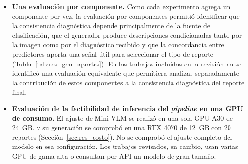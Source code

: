 \begin{itemize}
    el 80\,\% de las imágenes con un riesgo de 0.085, sin umbrales ajustados sobre el conjunto de prueba
    (Sección~\ref{sec:disc_concordancia}).
    \item \textbf{Una evaluación por componente.} Como cada experimento agrega un componente por vez, la evaluación por componentes permitió identificar que la consistencia diagnóstica depende principalmente de la fuente de clasificación, que el generador produce descripciones condicionadas tanto por la imagen como por el diagnóstico recibido y que la concordancia entre predictores aporta una señal útil para seleccionar el tipo de reporte (Tabla~\ref{tab:res_gen_aportes}). En los trabajos incluidos en la revisión no se identificó una evaluación equivalente que permitiera analizar separadamente la contribución de estos componentes a la consistencia diagnóstica del reporte final.
    \item \textbf{Evaluación de la factibilidad de inferencia del \emph{pipeline} en una GPU de consumo.} El ajuste de Mini-VLM se realizó en una sola GPU A30 de 24~GB, y su generación se comprobó en una RTX 4070 de 12~GB con 20 reportes (Sección~\ref{sec:res_costo}). No se comprobó el ajuste completo del modelo en esa configuración. Los trabajos revisados, en cambio, usan varias GPU de gama alta o consultan por API un modelo de gran tamaño.
\end{itemize}
